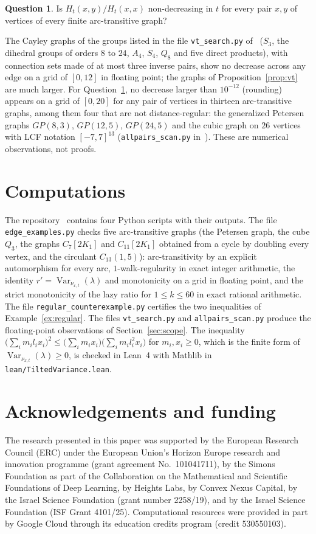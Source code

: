 \documentclass[11pt]{amsart}
\theoremstyle{definition}
\newtheorem{question}[theorem]{Question}
\theoremstyle{remark}
\DeclareMathOperator{\Var}{Var}
\begin{document}
\begin{question}\label{q:pairs}
Is $H_t(x,y)/H_t(x,x)$ non-decreasing in $t$ for every pair $x,y$ of vertices of every finite arc-transitive graph?
\end{question}

The Cayley graphs of the groups listed in the file \texttt{vt\_search.py} of~\cite{code} ($S_3$, the dihedral groups of orders $8$ to $24$, $A_4$, $S_4$, $Q_8$ and five direct products), with connection sets made of at most three inverse pairs, show no decrease across any edge on a grid of $[0,12]$ in floating point; the graphs of Proposition~\ref{prop:vt} are much larger. For Question~\ref{q:pairs}, no decrease larger than $10^{-12}$ (rounding) appears on a grid of $[0,20]$ for any pair of vertices in thirteen arc-transitive graphs, among them four that are not distance-regular: the generalized Petersen graphs $GP(8,3)$, $GP(12,5)$, $GP(24,5)$ and the cubic graph on $26$ vertices with LCF notation $[-7,7]^{13}$ (\texttt{allpairs\_scan.py} in~\cite{code}). These are numerical observations, not proofs.

\section*{Computations}
The repository~\cite{code} contains four Python scripts with their outputs. The file \texttt{edge\_examples.py} checks five arc-transitive graphs (the Petersen graph, the cube $Q_3$, the graphs $C_7[2K_1]$ and $C_{11}[2K_1]$ obtained from a cycle by doubling every vertex, and the circulant $C_{13}(1,5)$): arc-transitivity by an explicit automorphism for every arc, $1$-walk-regularity in exact integer arithmetic, the identity $r'=\Var_{\nu_{x,t}}(\lambda)$ and monotonicity on a grid in floating point, and the strict monotonicity of the lazy ratio for $1\le k\le60$ in exact rational arithmetic. The file \texttt{regular\_counterexample.py} certifies the two inequalities of Example~\ref{ex:regular}. The files \texttt{vt\_search.py} and \texttt{allpairs\_scan.py} produce the floating-point observations of Section~\ref{sec:scope}. The inequality $\bigl(\sum_i m_il_ix_i\bigr)^2\le\bigl(\sum_i m_ix_i\bigr)\bigl(\sum_i m_il_i^2x_i\bigr)$ for $m_i,x_i\ge0$, which is the finite form of $\Var_{\nu_{x,t}}(\lambda)\ge0$, is checked in Lean~4 with Mathlib in \texttt{lean/TiltedVariance.lean}.

\section*{Acknowledgements and funding}
The research presented in this paper was supported by the European Research
Council (ERC) under the European Union's Horizon Europe research and
innovation programme (grant agreement No.~101041711), by the Simons
Foundation as part of the Collaboration on the Mathematical and Scientific
Foundations of Deep Learning, by Heights Labs, by Convex Nexus Capital, by
the Israel Science Foundation (grant number 2258/19), and by the Israel
Science Foundation (ISF Grant 4101/25). Computational resources were
provided in part by Google Cloud through its education credits program
(credit 530550103).
\end{document}
